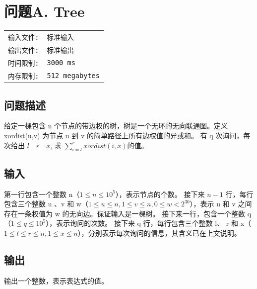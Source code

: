 \documentclass{article}
\begin{document}
\newpage
\section*{\textsf{问题A. }\textrm{Tree}}
\begin{tabular}{ll}
	\fontsize{10pt}{10pt}\texttt{输入文件:} & \fontsize{10pt}{10pt}\texttt{标准输入}          \\
	\fontsize{10pt}{10pt}\texttt{输出文件:} & \fontsize{10pt}{10pt}\texttt{标准输出}          \\
	\fontsize{10pt}{10pt}\texttt{时间限制:} & \fontsize{10pt}{10pt}\texttt{3000 ms}       \\
	\fontsize{10pt}{10pt}\texttt{内存限制:} & \fontsize{10pt}{10pt}\texttt{512 megabytes} \\
\end{tabular}

\subsection*{\textsf{问题描述}}
给定一棵包含 n 个节点的带边权的树，树是一个无环的无向联通图。定义 xordist(u,v) 为节点 u 到 v 的简单路径上所有边权值的异或和。\newline
\makebox[2em][l]{}有 q 次询问，每次给出 $l \quad r \quad x$, 求 $\sum_{i=l}^{r}xordist(i,x)$的值。\newline

\subsection*{\textsf{输入}}
第一行包含一个整数 n（$1 \leq n \leq 10^{5}$），表示节点的个数。\newline
\makebox[2em][l]{}接下来 $n-1$ 行，每行包含三个整数 u 、v 和 w（$1 \leq u \leq n, 1 \leq v \leq n, 0 \leq w < 2^{30}$），表示 u 和 v 之间存在一条权值为 w 的无向边。保证输入是一棵树。\newline
\makebox[2em][l]{}接下来一行，包含一个整数 q（$1 \leq q \leq 10^{5}$），表示询问的次数。\newline
\makebox[2em][l]{}接下来 q 行，每行包含三个整数 l、 r 和 x（$1 \leq l \leq r \leq n, 1 \leq x \leq n$），分别表示每次询问的信息，其含义已在上文说明。\newline

\subsection*{\textsf{输出}}
输出一个整数，表示表达式的值。\\
\end{document}
